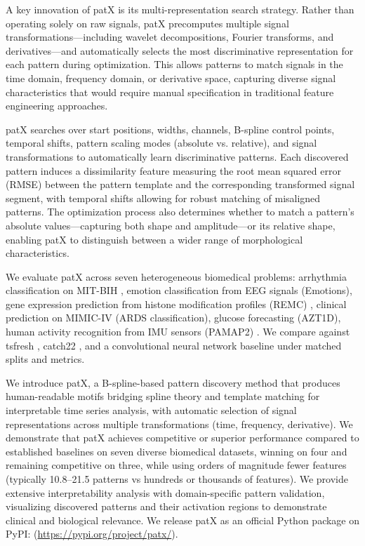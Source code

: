 \documentclass[11pt]{article}
\begin{document}
A key innovation of patX is its multi-representation search strategy.
Rather than operating solely on raw signals, patX precomputes multiple signal
transformations---including wavelet decompositions, Fourier transforms, and
derivatives---and automatically selects the most discriminative representation
for each pattern during optimization.
This allows patterns to match signals in the time domain, frequency domain,
or derivative space, capturing diverse signal characteristics that would
require manual specification in traditional feature engineering approaches.

patX searches over start positions, widths, channels, B-spline control
points, temporal shifts, pattern scaling modes (absolute vs. relative), and
signal transformations to automatically learn discriminative patterns.
Each discovered pattern induces a dissimilarity feature measuring the root mean
squared error (RMSE) between the pattern template and the corresponding
transformed signal segment, with temporal shifts allowing for robust matching
of misaligned patterns.
The optimization process also determines whether to match a pattern's absolute
values---capturing both shape and amplitude---or its relative shape, enabling
patX to distinguish between a wider range of morphological characteristics.

We evaluate patX across seven heterogeneous biomedical problems: arrhythmia
classification on MIT-BIH \cite{MoodyMark1992,Goldberger2000}, emotion
classification from EEG signals (Emotions), gene expression prediction
from histone modification profiles (REMC) \cite{Roadmap2015}, clinical
prediction on MIMIC-IV \cite{Johnson2023MIMICIV} (ARDS classification),
glucose forecasting (AZT1D), human activity recognition from IMU sensors
(PAMAP2) \cite{Reiss2012PAMAP2}.
We compare against tsfresh \cite{christ2018tsfresh}, catch22 \cite{lubba2019catch22}, 
and a convolutional neural network baseline under matched splits and metrics.

We introduce patX, a B-spline-based pattern discovery method that
produces human-readable motifs bridging spline theory and template matching
for interpretable time series analysis, with automatic selection of signal
representations across multiple transformations (time, frequency, derivative).
We demonstrate that patX achieves competitive or superior performance
compared to established baselines on seven diverse biomedical datasets,
winning on four and remaining competitive on three, while using orders of
magnitude fewer features (typically 10.8--21.5 patterns vs hundreds or
thousands of features).
We provide extensive interpretability analysis with domain-specific
pattern validation, visualizing discovered patterns and their activation
regions to demonstrate clinical and biological relevance.
We release patX as an official Python package on PyPI: (\url{https://pypi.org/project/patx/}).
\end{document}
